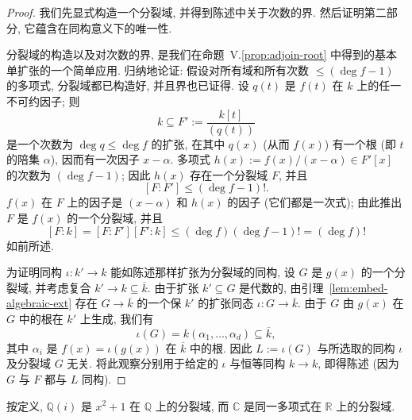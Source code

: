 \begin{proof}
我们先显式构造一个分裂域, 并得到陈述中关于次数的界. 然后证明第二部分, 它蕴含在同构意义下的唯一性.

分裂域的构造以及对次数的界, 是我们在命题~V.\ref{prop:adjoin-root} 中得到的基本单扩张的一个简单应用. 归纳地论证: 假设对所有域和所有次数 $\leq(\deg f-1)$ 的多项式, 分裂域都已构造好, 并且界也已证得. 设 $q(t)$ 是 $f(t)$ 在 $k$ 上的任一不可约因子; 则
\[
k\subseteq F':=\frac{k[t]}{(q(t))}
\]
是一个次数为 $\deg q\leq\deg f$ 的扩张, 在其中 $q(x)$ (从而 $f(x)$) 有一个根 (即 $t$ 的陪集 $\alpha$), 因而有一次因子 $x-\alpha$. 多项式 $h(x):=f(x)/(x-\alpha)\in F'[x]$ 的次数为 $(\deg f-1)$; 因此 $h(x)$ 存在一个分裂域 $F$, 并且
\[
[F:F']\leq(\deg f-1)!.
\]
$f(x)$ 在 $F$ 上的因子是 $(x-\alpha)$ 和 $h(x)$ 的因子 (它们都是一次式); 由此推出 $F$ 是 $f(x)$ 的一个分裂域, 并且
\[
[F:k]=[F:F'][F':k]\leq(\deg f)(\deg f-1)!=(\deg f)!
\]
如前所述.

为证明同构 $\iota:k'\to k$ 能如陈述那样扩张为分裂域的同构, 设 $G$ 是 $g(x)$ 的一个分裂域, 并考虑复合 $k'\to k\subseteq\overline{k}$. 由于扩张 $k'\subseteq G$ 是代数的, 由引理~\ref{lem:embed-algebraic-ext} 存在 $G\to\overline{k}$ 的一个保 $k'$ 的扩张同态 $\iota:G\to\overline{k}$. 由于 $G$ 由 $g(x)$ 在 $G$ 中的根在 $k'$ 上生成, 我们有
\[
\iota(G)=k(\alpha_1,\dots,\alpha_d)\subseteq\overline{k},
\]
其中 $\alpha_i$ 是 $f(x)=\iota(g(x))$ 在 $\overline{k}$ 中的根. 因此 $L:=\iota(G)$ 与所选取的同构 $\iota$ 及分裂域 $G$ 无关. 将此观察分别用于给定的 $\iota$ 与恒等同构 $k\to k$, 即得陈述 (因为 $G$ 与 $F$ 都与 $L$ 同构).
\end{proof}

\begin{example}\label{ex:Qi-splitting}
按定义, $\mathbb{Q}(i)$ 是 $x^2+1$ 在 $\mathbb{Q}$ 上的分裂域, 而 $\mathbb{C}$ 是同一多项式在 $\mathbb{R}$ 上的分裂域.
\end{example}

